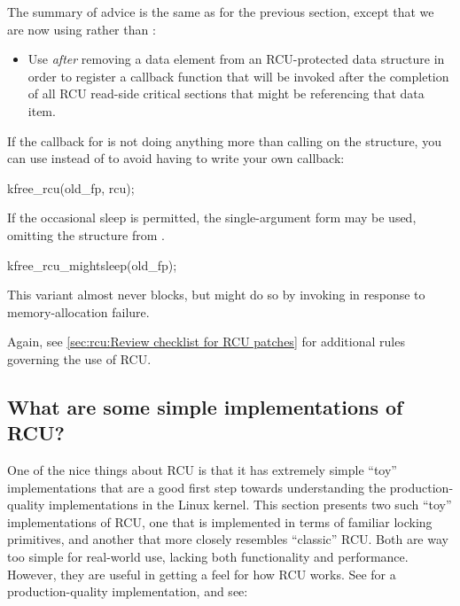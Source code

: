 The summary of advice is the same as for the previous section, except
that we are now using  rather than :

\begin{itemize}
\item	Use  \emph{after} removing a data element from an
	RCU-protected data structure in order to register a callback
	function that will be invoked after the completion of all RCU
	read-side critical sections that might be referencing that
	data item.
\end{itemize}

If the callback for  is not doing anything more than calling
 on the structure, you can use  instead of 
to avoid having to write your own callback:

\begin{VerbatimU}
	kfree_rcu(old_fp, rcu);
\end{VerbatimU}

If the occasional sleep is permitted, the single-argument form may
be used, omitting the  structure from .

\begin{VerbatimU}
	kfree_rcu_mightsleep(old_fp);
\end{VerbatimU}

This variant almost never blocks, but might do so by invoking
 in response to memory-allocation failure.

Again, see \cref{sec:rcu:Review checklist for RCU patches}
for additional rules governing the use of RCU\@.


\subsection{What are some simple implementations of RCU?}
\label{sec:rcu:What are some simple implementations of RCU?}

One of the nice things about RCU is that it has extremely simple ``toy''
implementations that are a good first step towards understanding the
production-quality implementations in the Linux kernel.
This section
presents two such ``toy'' implementations of RCU, one that is implemented
in terms of familiar locking primitives, and another that more closely
resembles ``classic'' RCU\@.
Both are way too simple for real-world use,
lacking both functionality and performance.
However, they are useful
in getting a feel for how RCU works.
See  for a
production-quality implementation, and see:

